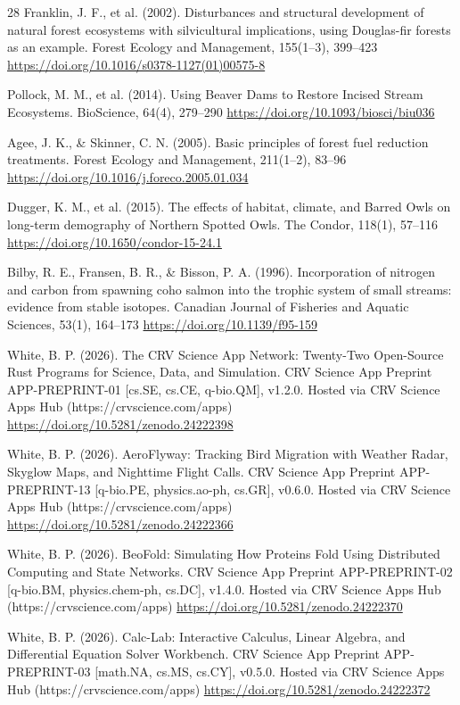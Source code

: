 \documentclass[10pt,letterpaper]{article}
\begin{document}
\begin{thebibliography}{28}
 Franklin, J. F., et al. (2002). Disturbances and structural development of natural forest ecosystems with silvicultural implications, using Douglas-fir forests as an example. Forest Ecology and Management, 155(1--3), 399--423 \url{https://doi.org/10.1016/s0378-1127(01)00575-8}

 Pollock, M. M., et al. (2014). Using Beaver Dams to Restore Incised Stream Ecosystems. BioScience, 64(4), 279--290 \url{https://doi.org/10.1093/biosci/biu036}

 Agee, J. K., \& Skinner, C. N. (2005). Basic principles of forest fuel reduction treatments. Forest Ecology and Management, 211(1--2), 83--96 \url{https://doi.org/10.1016/j.foreco.2005.01.034}

 Dugger, K. M., et al. (2015). The effects of habitat, climate, and Barred Owls on long-term demography of Northern Spotted Owls. The Condor, 118(1), 57--116 \url{https://doi.org/10.1650/condor-15-24.1}

 Bilby, R. E., Fransen, B. R., \& Bisson, P. A. (1996). Incorporation of nitrogen and carbon from spawning coho salmon into the trophic system of small streams: evidence from stable isotopes. Canadian Journal of Fisheries and Aquatic Sciences, 53(1), 164--173 \url{https://doi.org/10.1139/f95-159}

 White, B. P. (2026). The CRV Science App Network: Twenty-Two Open-Source Rust Programs for Science, Data, and Simulation. CRV Science App Preprint APP-PREPRINT-01 [cs.SE, cs.CE, q-bio.QM], v1.2.0. Hosted via CRV Science Apps Hub (https://crvscience.com/apps) \url{https://doi.org/10.5281/zenodo.24222398}

 White, B. P. (2026). AeroFlyway: Tracking Bird Migration with Weather Radar, Skyglow Maps, and Nighttime Flight Calls. CRV Science App Preprint APP-PREPRINT-13 [q-bio.PE, physics.ao-ph, cs.GR], v0.6.0. Hosted via CRV Science Apps Hub (https://crvscience.com/apps) \url{https://doi.org/10.5281/zenodo.24222366}

 White, B. P. (2026). BeoFold: Simulating How Proteins Fold Using Distributed Computing and State Networks. CRV Science App Preprint APP-PREPRINT-02 [q-bio.BM, physics.chem-ph, cs.DC], v1.4.0. Hosted via CRV Science Apps Hub (https://crvscience.com/apps) \url{https://doi.org/10.5281/zenodo.24222370}

 White, B. P. (2026). Calc-Lab: Interactive Calculus, Linear Algebra, and Differential Equation Solver Workbench. CRV Science App Preprint APP-PREPRINT-03 [math.NA, cs.MS, cs.CY], v0.5.0. Hosted via CRV Science Apps Hub (https://crvscience.com/apps) \url{https://doi.org/10.5281/zenodo.24222372}


\end{thebibliography}
\end{document}
